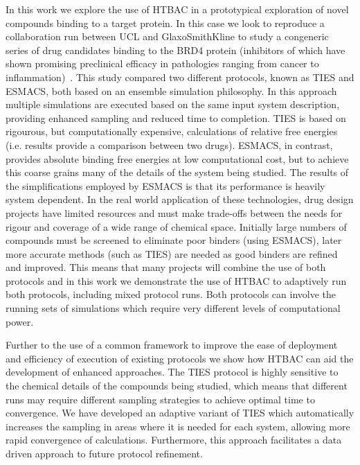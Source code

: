 In this work we explore the use of HTBAC in a prototypical exploration of novel 
compounds binding to a target protein.
In this case we look to reproduce a collaboration run between UCL and GlaxoSmithKline 
to study a congeneric series of drug candidates binding to the BRD4 protein (inhibitors 
of which have shown promising preclinical efficacy in pathologies ranging from cancer to
inflammation)~\cite{Wan2017brd4}.
This study compared two different protocols, known as TIES and ESMACS, both based on an 
ensemble simulation philosophy.
In this approach multiple simulations are executed based on the same input system description, 
providing enhanced sampling and reduced time to completion.
TIES is based on rigourous, but computationally expensive, calculations of relative free
energies (i.e. results provide a comparison between two drugs).
ESMACS, in contrast, provides absolute binding free energies at low computational cost, 
but to achieve this coarse grains many of the details of the system being studied.
The results of the simplifications employed by ESMACS is that its performance is heavily 
system dependent.
In the real world application of these technologies, drug design projects have limited 
resources and must make trade-offs between the needs for rigour and coverage of a wide 
range of chemical space. 
Initially large numbers of compounds must be screened to eliminate poor binders (using ESMACS), 
later more accurate methods (such as TIES) are needed as good binders are refined and improved.
This means that many projects will combine the use of both protocols and in this work we 
demonstrate the use of HTBAC to adaptively run both protocols, including mixed protocol runs.
Both protocols can involve the running sets of simulations which require very different levels 
of computational power.

Further to the use of a common framework to improve the ease of deployment and efficiency of 
execution of existing protocols we show how HTBAC can aid the development of enhanced approaches.
The TIES protocol is highly sensitive to the chemical details of the compounds being studied,
which means that different runs may require different sampling strategies to achieve optimal 
time to convergence.
We have developed an adaptive variant of TIES which automatically increases the sampling in 
areas where it is needed for each system, allowing more rapid convergence of calculations.
Furthermore, this approach facilitates a data driven approach to future protocol 
refinement.

